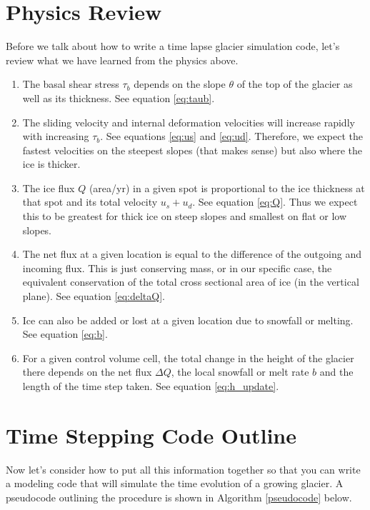\documentclass[11pt, oneside]{article}   	%
\begin{document}
 \section*{Physics Review}
 Before we talk about how to write a time lapse glacier simulation code, let's review what we have learned from the physics above.
 \begin{enumerate}
\item The basal shear stress $\tau_b$ depends on the slope $\theta$ of the top of the glacier as well as its thickness. See equation \ref{eq:taub}.
\item The sliding velocity and internal deformation velocities will increase rapidly with increasing $\tau_b$. See equations \ref{eq:us} and \ref{eq:ud}. Therefore, we expect the fastest velocities on the steepest slopes (that makes sense) but also where the ice is thicker.
\item The ice flux $Q$ (area/yr) in a given spot is proportional to the ice thickness at that spot and its total velocity $u_s + u_d$. See equation \ref{eq:Q}. Thus we expect this to be greatest for thick ice on steep slopes and smallest on flat or low slopes.
\item The net flux at a given location is equal to the difference of the outgoing and incoming flux. This is just conserving mass, or in our specific case, the equivalent conservation of the total cross sectional area of ice (in the vertical plane). See equation \ref{eq:deltaQ}.
\item Ice can also be added or lost at a given location due to snowfall or melting. See equation \ref{eq:b}.
\item For a given control volume cell, the total change in the height of the glacier there depends on the net flux $\Delta Q$, the local snowfall or melt  rate $b$ and the length of the time step taken. See equation \ref{eq:h_update}.
\end{enumerate}

 
 \section*{Time Stepping  Code Outline}
 
Now let's consider how to put all this information together so that you can write a modeling code that will simulate the time evolution of a growing glacier.  A pseudocode outlining the procedure is shown in Algorithm \ref{pseudocode} below.
\end{document}
